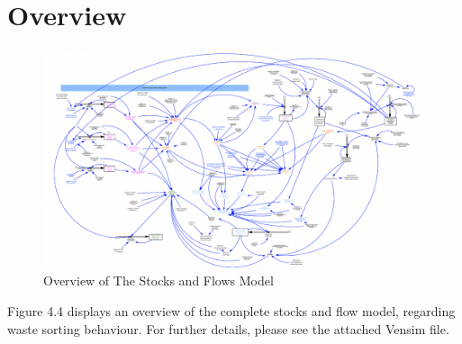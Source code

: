 \section{Overview}

\begin{figure}[H]
\centering
\includegraphics [scale=0.28,angle=360]{figures/overview.png}
\caption{Overview of The Stocks and Flows Model}
\label{fig:overview}
\end{figure}

\indent \newline
Figure 4.4 displays an overview of the complete stocks and flow model, regarding waste sorting behaviour. For further details, please see the attached Vensim file. 

